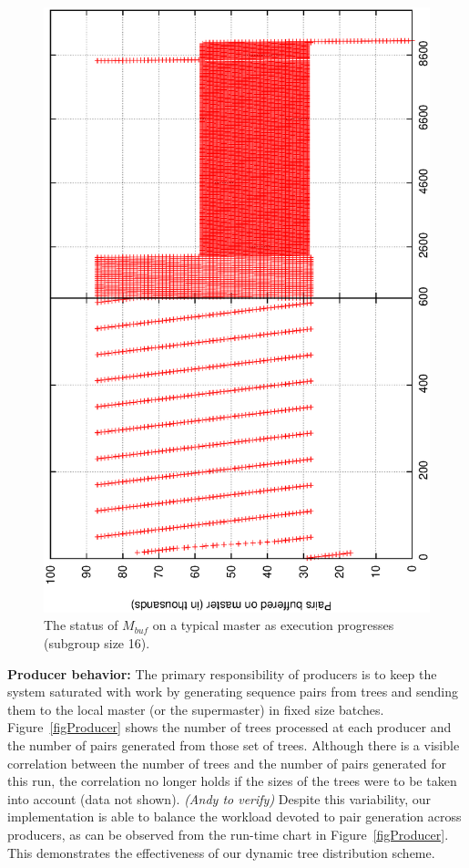 \documentclass[10pt,journal,letterpaper,compsoc]{IEEEtran}
\begin{document}
\begin{figure}[thb]
\centerline{
						\includegraphics[angle=-90, scale=0.33]{Group.pBuf.eps}
            }
\caption{
The status of $M_{buf}$ on a typical master as execution progresses (subgroup size 16). 
}
\label{figMBuffer}
\end{figure}

{\bf Producer behavior:} The primary responsibility of producers is to keep the system saturated with work by generating sequence pairs from trees and sending them to the local master (or the supermaster) in fixed size batches. Figure~\ref{figProducer} shows the number of trees processed at each producer and the number of pairs generated from those set of trees. Although there is a visible correlation between the number of trees and the number of pairs generated for this run, the correlation no longer holds if the sizes of the trees were to be taken into account (data not shown). {\it (Andy to verify)} Despite this variability, our implementation is able to balance the workload devoted to pair generation across producers, as can be observed from the run-time chart in Figure~\ref{figProducer}. This demonstrates the effectiveness of our dynamic tree distribution scheme. 
\end{document}
